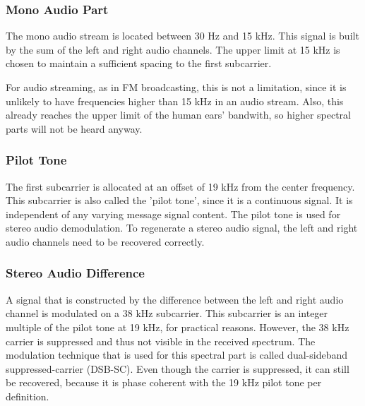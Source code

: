 \subsubsection{Mono Audio Part}

The mono audio stream is located between 30 Hz and 15 kHz.
This signal is built by the sum of the left and right audio channels.
The upper limit at 15 kHz is chosen to maintain a sufficient spacing to the first subcarrier.

For audio streaming, as in FM broadcasting, this is not a limitation, since it is unlikely to have frequencies higher than 15 kHz in an audio stream.
Also, this already reaches the upper limit of the human ears' bandwith, so higher spectral parts will not be heard anyway.

\subsubsection{Pilot Tone}

The first subcarrier is allocated at an offset of 19 kHz from the center frequency.
This subcarrier is also called the 'pilot tone', since it is a continuous signal.
It is independent of any varying message signal content.
The pilot tone is used for stereo audio demodulation.
To regenerate a stereo audio signal, the left and right audio channels need to be recovered correctly.

\subsubsection{Stereo Audio Difference}

A signal that is constructed by the difference between the left and right audio channel is modulated on a 38 kHz subcarrier.
This subcarrier is an integer multiple of the pilot tone at 19 kHz, for practical reasons.
However, the 38 kHz carrier is suppressed and thus not visible in the received spectrum.
The modulation technique that is used for this spectral part is called dual-sideband suppressed-carrier (DSB-SC).
Even though the carrier is suppressed, it can still be recovered, because it is phase coherent with the 19 kHz pilot tone per definition.

